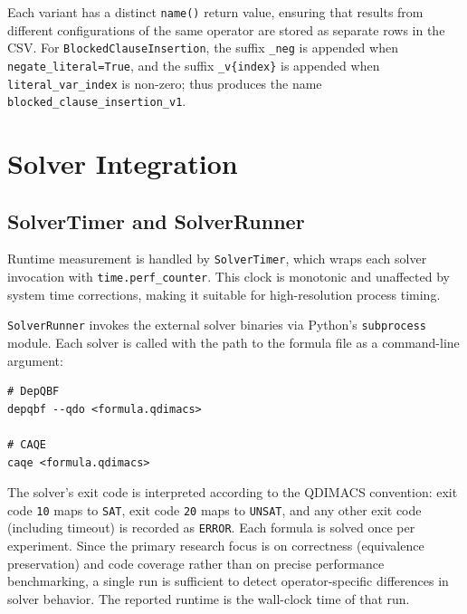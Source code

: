 Each variant has a distinct \texttt{name()} return value, ensuring that 
results from different configurations of the same operator are stored as 
separate rows in the CSV. 
For \texttt{BlockedClauseInsertion}, the suffix \texttt{\_neg} is appended when 
\texttt{negate\_literal=True}, and the suffix \texttt{\_v\{index\}} is appended when \texttt{literal\_var\_index} 
is non-zero; thus \texttt{} 
produces the name \texttt{blocked\_clause\_insertion\_v1}.

\section{Solver Integration}\label{sec:solver-impl}

\subsection{SolverTimer and SolverRunner}

Runtime measurement is handled by \texttt{SolverTimer}, which wraps each solver invocation with \texttt{time.perf\_counter}. This clock is monotonic and unaffected by system time corrections, making it suitable for high-resolution process timing.

\texttt{SolverRunner} invokes the external solver binaries via Python's \texttt{subprocess} module. Each solver is called with the path to the formula file as a command-line argument:

\begin{listing}[H]
\caption{Solver invocation commands.}
\label{lst:solver-calls}
\begin{verbatim}
# DepQBF
depqbf --qdo <formula.qdimacs>

# CAQE
caqe <formula.qdimacs>
\end{verbatim}
\end{listing}

The solver's exit code is interpreted according to the QDIMACS convention: 
exit code \texttt{10} maps to \texttt{SAT}, exit code \texttt{20} maps to 
\texttt{UNSAT}, and any other exit code (including timeout) is recorded as 
\texttt{ERROR}. Each formula is solved once per experiment. Since the primary 
research focus is on correctness (equivalence preservation) and code coverage 
rather than on precise performance benchmarking, a single run is sufficient to 
detect operator-specific differences in solver behavior. The reported runtime 
is the wall-clock time of that run.

